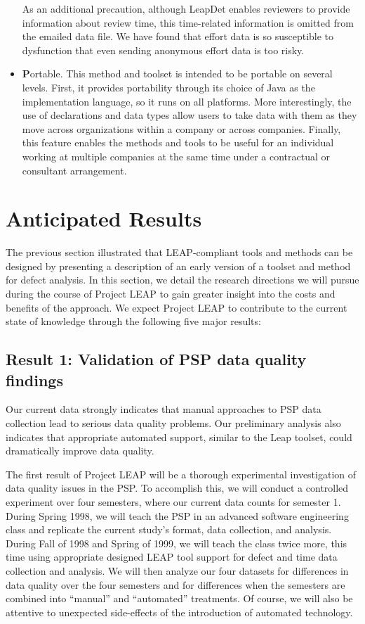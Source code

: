 \begin{itemize}
  As an additional precaution, although LeapDet enables reviewers to provide
  information about review time, this time-related information is omitted
  from the emailed data file. We have found that effort data is so susceptible
  to dysfunction that even sending anonymous effort data is too risky.
  
\item {\bf P}ortable.  This method and toolset is intended to be portable
  on several levels. First, it provides portability through its choice of
  Java as the implementation language, so it runs on all platforms. More
  interestingly, the use of declarations and data types allow users to take
  data with them as they move across organizations within a company or
  across companies. Finally, this feature enables the methods and
  tools to be useful for an individual working at multiple companies at the
  same time under a contractual or consultant arrangement. 

\end{itemize}


\section{Anticipated Results}

The previous section illustrated that LEAP-compliant tools and methods can
be designed by presenting a description of an early version of a toolset and
method for defect analysis.  In this section, we detail the research
directions we will pursue during the course of Project LEAP to gain greater
insight into the costs and benefits of the approach. We expect Project LEAP
to contribute to the current state of knowledge through the following five
major results:

\subsection*{Result 1: Validation of PSP data quality findings}

Our current data strongly indicates that manual approaches to PSP data
collection lead to serious data quality problems.  Our preliminary analysis
also indicates that appropriate automated support, similar to the Leap
toolset, could dramatically improve data quality. 

The first result of Project LEAP will be a thorough experimental
investigation of data quality issues in the PSP. To accomplish this, we
will conduct a controlled experiment over four semesters, where our current
data counts for semester 1. During Spring 1998, we will teach the PSP in an
advanced software engineering class and replicate the current study's
format, data collection, and analysis.  During Fall of 1998 and Spring of
1999, we will teach the class twice more, this time using appropriate
designed LEAP tool support for defect and time data collection and
analysis. We will then analyze our four datasets for differences in data
quality over the four semesters and for differences when the semesters are
combined into ``manual'' and ``automated'' treatments. Of course, we will
also be attentive to unexpected side-effects of the introduction of
automated technology.  

